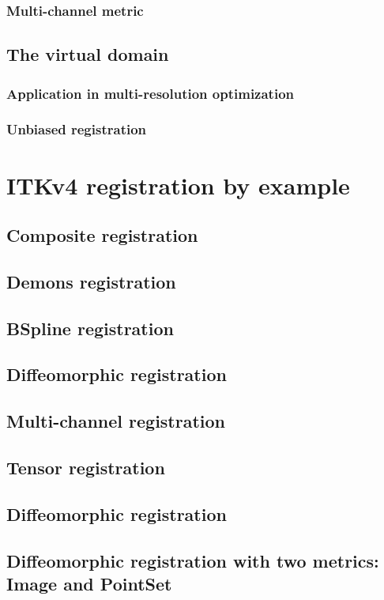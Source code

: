 \documentclass{article}
\begin{document}
\subsubsection{Multi-channel metric}

\subsection{The virtual domain}
\subsubsection{Application in multi-resolution optimization}
\subsubsection{Unbiased registration}

\section{ITKv4 registration by example}

\subsection{Composite registration}
\subsection{Demons registration}
\subsection{BSpline registration}
\subsection{Diffeomorphic registration}
\subsection{Multi-channel registration}
\subsection{Tensor registration}
\subsection{Diffeomorphic registration}
\subsection{Diffeomorphic registration with two metrics: Image and
  PointSet}
\end{document}
